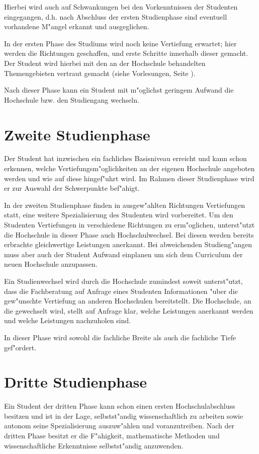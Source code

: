 Hierbei wird auch auf Schwankungen bei den Vorkenntnissen der Studenten
eingegangen, d.h. nach Abschluss der ersten Studienphase sind eventuell 
vorhandene M"angel erkannt und ausgeglichen.

In der ersten Phase des Studiums wird noch keine Vertiefung erwartet; hier werden
die Richtungen geschaffen, und erste Schritte innerhalb dieser gemacht.
Der Student wird hierbei mit den an der Hochschule behandelten Themengebieten
vertraut gemacht (siehe Vorlesungen, Seite \pageref{vorlesung:anforderungen}).

Nach dieser Phase kann ein Student mit m"oglichst geringem Aufwand die Hochschule
bzw. den Studiengang wechseln.


\section{Zweite Studienphase}

Der Student hat inzwischen ein fachliches Basisniveau erreicht und
kann schon erkennen, welche Vertiefungsm"oglichkeiten an der eigenen Hochschule angeboten
werden und wie auf diese hingef"uhrt wird.
Im Rahmen dieser Studienphase wird er zur Auswahl der Schwerpunkte bef"ahigt. 

In der zweiten Studienphase finden in ausgew"ahlten Richtungen Vertiefungen statt,
eine weitere Spezialisierung des Studenten wird vorbereitet. Um den Studenten Vertiefungen in verschiedene Richtungen zu erm"oglichen, unterst"utzt die Hochschule
in dieser Phase auch Hochschulwechsel.
Bei diesen werden bereits erbrachte gleichwertige Leistungen anerkannt.
Bei abweichenden Studieng"angen muss
aber auch der Student Aufwand einplanen um sich dem Curriculum der neuen
Hochschule anzupassen.

Ein Studienwechsel wird durch die Hochschule zumindest soweit unterst"utzt, dass die Fachberatung auf Anfrage eines Studenten Informationen "uber die gew"unschte Vertiefung an anderen Hochschulen bereitstellt. Die Hochschule, an die gewechselt wird, stellt auf Anfrage klar, welche Leistungen anerkannt werden und welche Leistungen nachzuholen sind.

In dieser Phase wird sowohl die fachliche Breite als auch die fachliche Tiefe gef"ordert.

\section{Dritte Studienphase}

Ein Student der dritten Phase kann schon einen ersten Hochschulabschluss besitzen
und ist in der Lage, selbstst"andig wissenschaftlich zu arbeiten sowie autonom seine Spezialisierung
auszuw"ahlen und voranzutreiben. Nach der dritten Phase besitzt er die F"ahigkeit,
mathematische Methoden und wissenschaftliche Erkenntnisse selbstst"andig anzuwenden.

